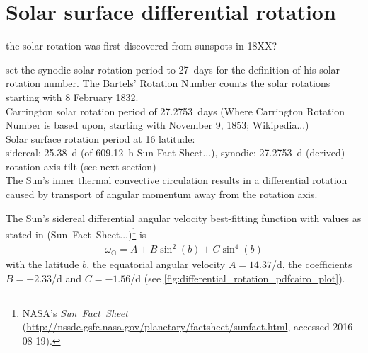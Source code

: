 




\section{Solar surface differential rotation}
\label{sec:solar_surface_differential_rotation}

the solar rotation was first discovered from sunspots in 18XX?

\citet{Bartels1934} set the synodic solar rotation period to 27~days for the definition of his solar rotation number. The Bartels' Rotation Number counts the solar rotations starting with 8 February 1832.\\
Carrington solar rotation period of 27.2753~days (Where Carrington Rotation Number is based upon, starting with November 9, 1853; Wikipedia...)\\

Solar surface rotation period at 16\degree{} latitude:\\
sidereal: 25.38~d (of 609.12~h Sun Fact Sheet...), synodic: 27.2753~d (derived)\\

rotation axis tilt (see next section)\\

The Sun's inner thermal convective circulation results in a differential rotation caused by transport of angular momentum away from the rotation axis.

The Sun's sidereal differential angular velocity best-fitting function with values as stated in (Sun~Fact~Sheet...)\footnote{NASA's \textit{Sun~Fact~Sheet} (\url{http://nssdc.gsfc.nasa.gov/planetary/factsheet/sunfact.html}, accessed 2016-08-19).} is
\begin{align}
	\omega_\odot = A + B \sin^2(b) + C \sin^4(b)
\end{align}
with the latitude $b$, the equatorial angular velocity $A = 14.37$\textdegree/d, the coefficients $B = -2.33$\textdegree/d and $C = -1.56$\textdegree/d (see \autoref{fig:differential_rotation_pdfcairo_plot}).

